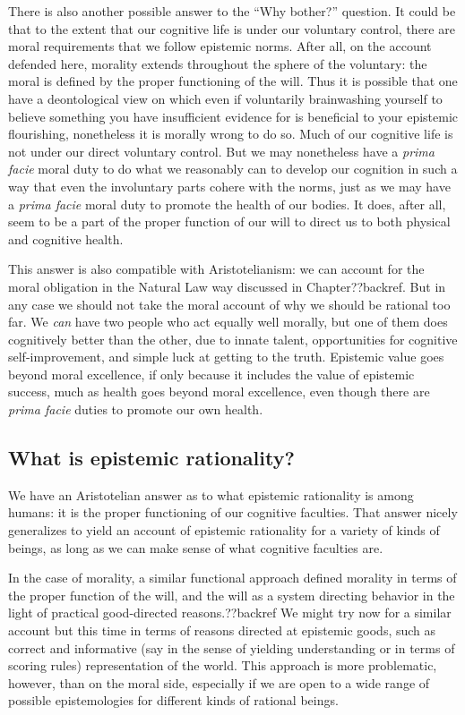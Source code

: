There is also another possible answer to the ``Why bother?'' question. It could be that to the extent
that our cognitive life is under our voluntary control, there are moral requirements that we follow epistemic
norms. After all, on the account defended here, morality extends throughout the sphere of the voluntary: 
the moral is defined by the proper functioning of the will. Thus it is possible that one have a deontological
view on which even if voluntarily brainwashing yourself to believe something you have insufficient evidence 
for is beneficial to your epistemic flourishing, nonetheless it is morally wrong to do so. 
Much of our cognitive life is not under our direct voluntary control. But we may nonetheless have a 
\textit{prima facie} moral duty  to do what we reasonably can to develop our cognition in such a way that even the 
involuntary parts cohere with the norms, just as we may have a \textit{prima facie} moral duty to promote the 
health of our bodies. It does, after all, seem to be a part of the proper function of our will to direct us to 
both physical and cognitive health.

This answer is also compatible with Aristotelianism: we can account for the moral obligation in the Natural Law
way discussed in Chapter??backref. But in any case we should not take the moral account of why we should be 
rational too far. We \textit{can} have two people who act equally well morally, but one 
of them does cognitively better than the other, due to innate talent, opportunities for cognitive self-improvement,
and simple luck at getting to the truth. Epistemic value goes beyond moral excellence, if only because it includes 
the value of epistemic success, much as health goes beyond moral excellence, even though there are \textit{prima 
facie} duties to promote our own health.

\subsection{What is epistemic rationality?}
We have an Aristotelian answer as to what epistemic rationality is among humans: it is the proper functioning of 
our cognitive faculties. That answer nicely generalizes to yield an account of epistemic rationality for a variety 
of kinds of beings, as long as we can make sense of what cognitive faculties are. 

In the case of morality, a similar functional approach defined morality in terms of the proper function of the will,
and the will as a system directing behavior in the light of practical good-directed reasons.??backref We might try now for
a similar account but this time in terms of reasons directed at epistemic goods, such as correct and informative 
(say in the sense of yielding understanding or in terms of scoring rules) representation of the world.
This approach is more problematic, however, than on the moral side, especially if we are open to a wide range of 
possible epistemologies for different kinds of rational beings.

